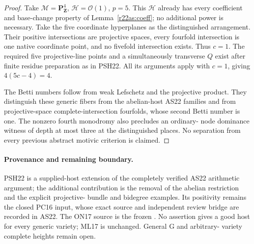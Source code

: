 \begin{proof}
Take $\mathcal M=\mathbf P^4_{\mathbf Z}$,
$\mathcal H=\mathcal O(1)$,
$p=5$.  This $\mathcal H$ already
has every coefficient and
base-change property of
Lemma~\ref{r22as:coeff}; no
additional power is necessary.
Take the five coordinate
hyperplanes as the distinguished
arrangement.  Their positive
intersections are projective
spaces, every fourfold
intersection is one native
coordinate point, and no
fivefold intersection exists.
Thus $c=1$.  The required
five projective-line points
and a simultaneously transverse
$Q$ exist after finite
residue preparation as in
PSH22.  All its arguments
apply with $c=1$, giving
$4(5c-4)=4$.

The Betti numbers follow
from weak Lefschetz and
the projective product.
They distinguish these
generic fibers from the
abelian-host AS22 families
and from projective-space
complete-intersection
fourfolds, whose second
Betti number is one.
The nonzero fourth monodromy
also precludes an ordinary-
node dominance witness of
depth at most three at
the distinguished places.
No separation from every
previous abstract motivic
criterion is claimed.
\end{proof}

\paragraph{Provenance and remaining boundary.}
PSH22 is a supplied-host
extension of the completely
verified AS22 arithmetic
argument; the additional
contribution is the removal
of the abelian restriction
and the explicit projective-
bundle and bidegree examples.
Its positivity remains the
closed PC16 input, whose
exact source and independent
review bridge are recorded
in AS22.  The ON17 source
is the frozen
.
No assertion gives a good
host for every generic
variety; ML17 is unchanged.
General G and arbitrary-
variety complete heights
remain open.
